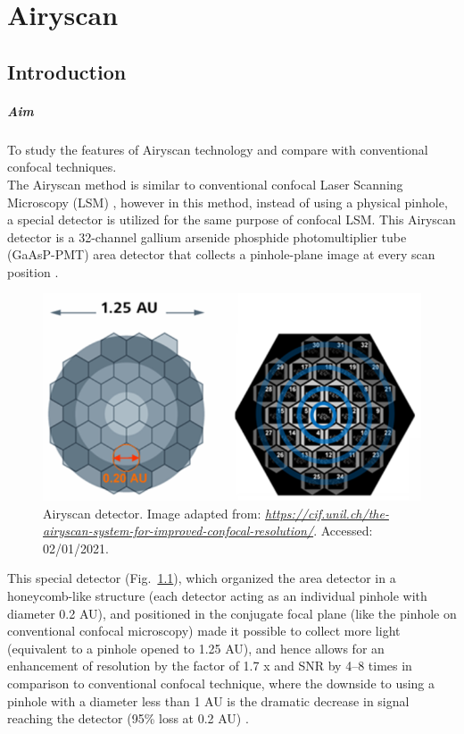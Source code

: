 
\chapter{Airyscan}
\label{chp:Airyscan}

\section{Introduction}

\paragraph{Aim}To study the features of Airyscan technology and compare with conventional confocal techniques.
\\

The Airyscan method is similar to conventional confocal Laser Scanning Microscopy (LSM) , however in this method, instead of using a physical pinhole, a special detector is utilized for the same purpose of confocal LSM.  
This Airyscan detector is a 32-channel gallium arsenide phosphide photomultiplier tube (GaAsP-PMT) area detector that collects a pinhole-plane image at every scan position \cite{Huff2015}. 

\begin{figure}[h!]
\centering
\includegraphics[width=.5\columnwidth]{Exp_6_Airyscan/Figures/airyscan_ed}
\caption{Airyscan detector. Image adapted from: \href{https://cif.unil.ch/the-airyscan-system-for-improved-confocal-resolution/}{\textit{https://cif.unil.ch/the-airyscan-system-for-improved-confocal-resolution/}}. Accessed: 02/01/2021.} 
\label{fig:airydet}
\end{figure}

This special detector (Fig.~\ref{fig:airydet}), which organized the area detector in a honeycomb-like structure (each detector acting as an individual pinhole with diameter 0.2 AU), and positioned in the conjugate focal plane (like the pinhole on conventional confocal microscopy) made it possible to collect more light (equivalent to a pinhole opened to 1.25 AU), and hence allows for an enhancement of resolution by the factor of 1.7 x and SNR by 4–8 times \cite{Bergter2016} in comparison to conventional confocal technique, where the downside to using a pinhole with a diameter less than 1 AU is the dramatic decrease in signal reaching the detector (95\% loss at 0.2 AU) \cite{Huff2015}.

